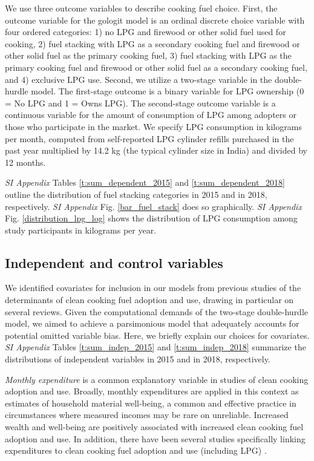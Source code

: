 \documentclass[11pt,english]{article}
\theoremstyle{plain} \newtheorem{claim}{Claim}
\theoremstyle{plain} \newtheorem{prop}{Proposition}
\theoremstyle{plain} \newtheorem{hypo}{Hypothesis}
\begin{document}
We use three outcome variables to describe cooking fuel choice. First, the outcome variable for the gologit model is an ordinal discrete choice variable with four ordered categories: 1) no LPG and firewood or other solid fuel used for cooking, 2) fuel stacking with LPG as a secondary cooking fuel and firewood or other solid fuel as the primary cooking fuel, 3) fuel stacking with LPG as the primary cooking fuel and firewood or other solid fuel as a secondary cooking fuel, and 4) exclusive LPG use. Second, we utilize a two-stage variable in the double-hurdle model. The first-stage outcome is a binary variable for LPG ownership (0 = No LPG and 1 = Owns LPG). The second-stage outcome variable is a continuous variable for the amount of consumption of LPG among adopters or those who participate in the market. We specify LPG consumption in kilograms per month, computed from self-reported LPG cylinder refills purchased in the past year multiplied by 14.2 kg (the typical cylinder size in India) and divided by 12 months. 

\textit{SI Appendix} Tables \ref{t:sum_dependent_2015} and \ref{t:sum_dependent_2018} outline the distribution of fuel stacking categories in 2015 and in 2018, respectively. \textit{SI Appendix} Fig. \ref{bar_fuel_stack} does so graphically. \textit{SI Appendix} Fig. \ref{distribution_lpg_log} shows the distribution of LPG consumption among study participants in kilograms per year.

\subsection*{Independent and control variables}
\label{sect:variable_specification}

We identified covariates for inclusion in our models from previous studies of the determinants of clean cooking fuel adoption and use, drawing in particular on several reviews\citep{MullerYan2018,Puzzoloetal2016,LewisPattanayak2012}. Given the computational demands of the two-stage double-hurdle model, we aimed to achieve a parsimonious model that adequately accounts for potential omitted variable bias. Here, we briefly explain our choices for covariates. \textit{SI Appendix} Tables \ref{t:sum_indep_2015} and \ref{t:sum_indep_2018} summarize the distributions of independent variables in 2015 and in 2018, respectively.

\textit{Monthly expenditure} is a common explanatory variable in studies of clean cooking adoption and use\citep{MullerYan2018}. Broadly, monthly expenditures are applied in this context as estimates of household material well-being, a common and effective practice in circumstances where measured incomes may be rare on unreliable\citep{Klasen2000}. Increased wealth and well-being are positively associated with increased clean cooking fuel adoption and use\citep{LewisPattanayak2012}. In addition, there have  been several studies specifically linking expenditures to clean cooking fuel adoption and use (including LPG) \citep{SaxenaBhattacharya2018,Heltberg2004,GuptaKohlin2006,Farsietal2007}.
\end{document}
